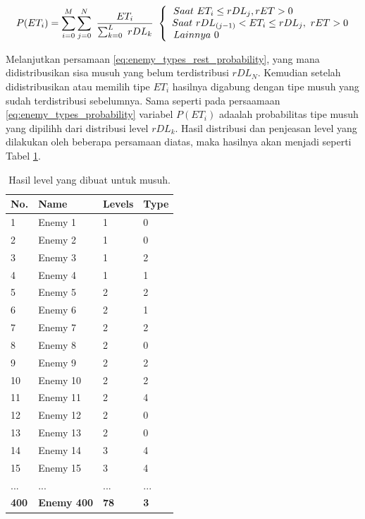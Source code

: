 \begin{equation}\label{eq:enemy_types_rest_probability}
	P(ET_{i}) = \sum_{i = 0}^{M} \sum_{j = 0}^{N}\ \frac{ET_{i}}{\sum_{k = 0}^{L}\ rDL_{k}}\
	\left\{\begin{matrix}
	\hspace{-5.0em} Saat\ ET_{i} \leq rDL_{j}, rET > 0\\
	\hspace{0.5em} Saat\ rDL_{(j-1)} < ET_{i} \leq rDL_{j},\ rET > 0\\
	\hspace{-12.5em} Lainnya\ 0
	\end{matrix}\right.
\end{equation}

Melanjutkan persamaan \ref{eq:enemy_types_rest_probability}, yang mana didistribusikan sisa musuh yang belum terdistribusi $rDL_{N}$. Kemudian setelah didistribusikan atau memilih tipe $ET_{i}$ hasilnya digabung dengan tipe musuh yang sudah terdistribusi sebelumnya. Sama seperti pada persaamaan \ref{eq:enemy_types_probability} variabel $P(ET_{i})$ adaalah probabilitas tipe musuh yang dipilihh dari distribusi level $rDL_{k}$. Hasil distribusi dan penjeasan level yang dilakukan oleh beberapa persamaan diatas, maka hasilnya akan menjadi seperti Tabel \ref{tb:enemy_type_distrib}.
\vspace{1ex}

\begin{table}[!h]
	\centering
	\caption{Hasil level yang dibuat untuk musuh.}
	\label{tb:enemy_type_distrib}
	\begin{tabular}{|l|l|l|l|}
		\hline
		\textbf{No.} & \textbf{Name} & \textbf{Levels} & \textbf{Type} \\ \hline
		1 & Enemy 1 & 1 & 0 \\ \hline
		2 & Enemy 2 & 1 & 0 \\ \hline
		3 & Enemy 3 & 1 & 2 \\ \hline
		4 & Enemy 4 & 1 & 1 \\ \hline
		5 & Enemy 5 & 2 & 2 \\ \hline
		6 & Enemy 6 & 2 & 1 \\ \hline
		7 & Enemy 7 & 2 & 2 \\ \hline
		8 & Enemy 8 & 2 & 0 \\ \hline
		9 & Enemy 9 & 2 & 2 \\ \hline
		10 & Enemy 10 & 2 & 2 \\ \hline
		11 & Enemy 11 & 2 & 4 \\ \hline
		12 & Enemy 12 & 2 & 0 \\ \hline
		13 & Enemy 13 & 2 & 0 \\ \hline
		14 & Enemy 14 & 3 & 4 \\ \hline
		15 & Enemy 15 & 3 & 4 \\ \hline
		... & ... & ... & ... \\ \hline
		\textbf{400} & \textbf{Enemy 400} & \textbf{78} & \textbf{3} \\ \hline
	\end{tabular}
\end{table}
\vspace{1ex}

